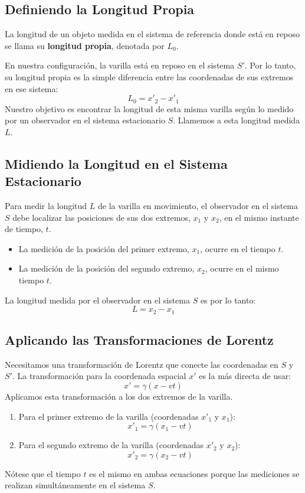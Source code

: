 \documentclass[11pt,a4paper]{article}
\begin{document}
\subsection{Definiendo la Longitud Propia}

La longitud de un objeto medida en el sistema de referencia donde está en reposo se llama su \textbf{longitud propia}, denotada por $L_0$.

En nuestra configuración, la varilla está en reposo en el sistema $S'$. Por lo tanto, su longitud propia es la simple diferencia entre las coordenadas de sus extremos en ese sistema:
\[ L_0 = x'_2 - x'_1 \]
Nuestro objetivo es encontrar la longitud de esta misma varilla según lo medido por un observador en el sistema estacionario $S$. Llamemos a esta longitud medida $L$.

\subsection{Midiendo la Longitud en el Sistema Estacionario}

Para medir la longitud $L$ de la varilla en movimiento, el observador en el sistema $S$ debe localizar las posiciones de sus dos extremos, $x_1$ y $x_2$, en el mismo instante de tiempo, $t$.
\begin{itemize}
    \item La medición de la posición del primer extremo, $x_1$, ocurre en el tiempo $t$.
    \item La medición de la posición del segundo extremo, $x_2$, ocurre en el mismo tiempo $t$.
\end{itemize}
La longitud medida por el observador en el sistema $S$ es por lo tanto:
\[ L = x_2 - x_1 \]

\subsection{Aplicando las Transformaciones de Lorentz}

Necesitamos una transformación de Lorentz que conecte las coordenadas en $S$ y $S'$. La transformación para la coordenada espacial $x'$ es la más directa de usar:
\[ x' = \gamma (x - vt) \]
Aplicamos esta transformación a los dos extremos de la varilla.
\begin{enumerate}
    \item Para el primer extremo de la varilla (coordenadas $x'_1$ y $x_1$):
    \[ x'_1 = \gamma (x_1 - vt) \]
    \item Para el segundo extremo de la varilla (coordenadas $x'_2$ y $x_2$):
    \[ x'_2 = \gamma (x_2 - vt) \]
\end{enumerate}
Nótese que el tiempo $t$ es el mismo en ambas ecuaciones porque las mediciones se realizan simultáneamente en el sistema $S$.
\end{document}
